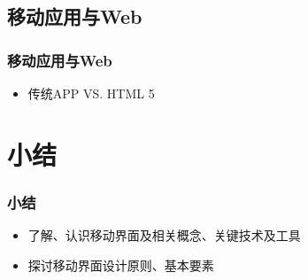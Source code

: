 \documentclass{beamer}
\begin{document}
\subsection{移动应用与Web}
\begin{frame}
	\frametitle{移动应用与Web}
	\begin{itemize}
	\item 传统APP VS. HTML 5
	\end{itemize}
\end{frame}

%

\section{小结}
\begin{frame}
	\frametitle{小结}
	\begin{itemize}
		\item 了解、认识移动界面及相关概念、关键技术及工具
		\item 探讨移动界面设计原则、基本要素
	\end{itemize}
\end{frame}
\end{document}
